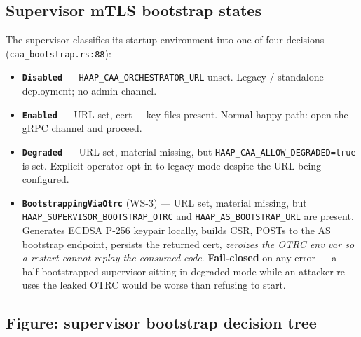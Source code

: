 \documentclass[11pt, a4paper]{article}
\newcommand{\code}[1]{\texttt{\small #1}}
\newcommand{\filepath}[1]{\textcolor{accentpurple}{\texttt{\small #1}}}
\begin{document}
\clearpage

\subsection{Supervisor mTLS bootstrap states}

The supervisor classifies its startup environment into one of four
decisions (\filepath{caa\_bootstrap.rs:88}):

\begin{itemize}
  \item \textbf{\code{Disabled}} --- \code{HAAP\_CAA\_ORCHESTRATOR\_URL}
        unset. Legacy / standalone deployment; no admin channel.
  \item \textbf{\code{Enabled}} --- URL set, cert + key files present.
        Normal happy path: open the gRPC channel and proceed.
  \item \textbf{\code{Degraded}} --- URL set, material missing, but
        \code{HAAP\_CAA\_ALLOW\_DEGRADED=true} is set. Explicit operator
        opt-in to legacy mode despite the URL being configured.
  \item \textbf{\code{BootstrappingViaOtrc}} (WS-3) --- URL set, material
        missing, but \code{HAAP\_SUPERVISOR\_BOOTSTRAP\_OTRC} and
        \code{HAAP\_AS\_BOOTSTRAP\_URL} are present. Generates ECDSA P-256
        keypair locally, builds CSR, POSTs to the AS bootstrap endpoint,
        persists the returned cert, \emph{zeroizes the OTRC env var so a
        restart cannot replay the consumed code}. \textbf{Fail-closed} on
        any error --- a half-bootstrapped supervisor sitting in degraded
        mode while an attacker re-uses the leaked OTRC would be worse
        than refusing to start.
\end{itemize}

\subsection{Figure: supervisor bootstrap decision tree}
\end{document}
